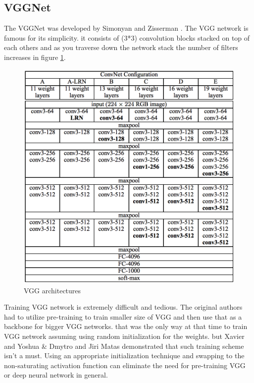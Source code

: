 \documentclass[10pt,twocolumn,letterpaper]{article}
\begin{document}
\subsection{VGGNet}

The VGGNet was developed by Simonyan and Zisserman \cite{VGGNet}. The VGG network is famous for its simplicity. it consists of (3*3) convolution blocks stacked on top of each others and as you traverse down the network stack the number of filters increases in figure \ref{fig:VGG_ARC}. 
\begin{figure}[h!]
  \includegraphics[width=\linewidth]{vgg_arc.png}
  \caption{VGG architectures}
  \label{fig:VGG_ARC}
\end {figure}

Training VGG network is extremely difficult and tedious. The original authors had to utilize pre-training to train smaller size of VGG and then use that as a backbone for bigger VGG networks. that was the only way at that time to train VGG network assuming using random initialization for the weights. but Xavier and Yoshua \cite{pmlr-v9-glorot10a} \& Dmytro and Jiri Matas \cite{ini_imp} demonstrated that such training scheme isn't  a must. Using an appropriate initialization technique and swapping to the non-saturating activation function can eliminate the need for pre-training VGG or deep neural network in general. 
\end{document}

